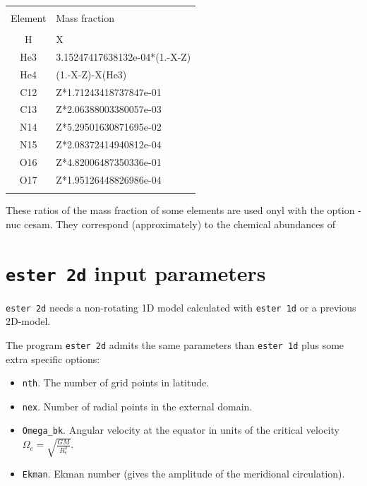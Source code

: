 \begin{center}

\begin{tabular}{c|l}
\hline
	   &   \\
	Element & Mass fraction \\
	   &   \\
        H  & X \\
        He3  & 3.15247417638132e-04*(1.-X-Z) \\
        He4  & (1.-X-Z)-X(He3) \\
        C12  & Z*1.71243418737847e-01 \\
        C13  & Z*2.06388003380057e-03 \\
        N14  & Z*5.29501630871695e-02 \\
        N15  & Z*2.08372414940812e-04 \\
        O16  & Z*4.82006487350336e-01 \\
        O17  & Z*1.95126448826986e-04 \\
	   &   \\
\hline
\end{tabular}

\end{center}

These ratios of the mass fraction of some elements are used onyl with
the option -nuc cesam. They correspond (approximately) to the chemical
abundances of \cite{GS98}



\section{{\tt ester 2d} input parameters}

{\tt ester 2d} needs a non-rotating 1D model
calculated with {\tt ester 1d} or a previous 2D-model.

The program {\tt ester 2d} admits the same parameters than {\tt ester 1d}
plus some extra specific options:

\begin{itemize}
\item {\tt nth}. The number of grid points in latitude.
\item {\tt nex}. Number of radial points in the external domain.
\item {\tt Omega\_bk}. Angular velocity at the equator in units of the critical velocity
$\Omega_c=\sqrt{\frac{GM}{R_e^3}}$.
\item {\tt Ekman}. Ekman number (gives the amplitude of the meridional circulation).
\end{itemize}

